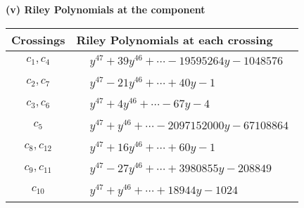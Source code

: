 \documentclass[1p]{elsarticle_modified}
\theoremstyle{definition}
\begin{document}
\flushleft \textbf{(v) Riley Polynomials at the component}\newline \\
\begin{tabular}{m{50pt}|m{274pt}}
Crossings & \hspace{64pt}Riley Polynomials at each crossing \\
\hline $$\begin{aligned}c_{1},c_{4}\end{aligned}$$&$\begin{aligned}
&y^{47}+39 y^{46}+\cdots-19595264 y-1048576
\end{aligned}$\\
\hline $$\begin{aligned}c_{2},c_{7}\end{aligned}$$&$\begin{aligned}
&y^{47}-21 y^{46}+\cdots+40 y-1
\end{aligned}$\\
\hline $$\begin{aligned}c_{3},c_{6}\end{aligned}$$&$\begin{aligned}
&y^{47}+4 y^{46}+\cdots-67 y-4
\end{aligned}$\\
\hline $$\begin{aligned}c_{5}\end{aligned}$$&$\begin{aligned}
&y^{47}+y^{46}+\cdots-2097152000 y-67108864
\end{aligned}$\\
\hline $$\begin{aligned}c_{8},c_{12}\end{aligned}$$&$\begin{aligned}
&y^{47}+16 y^{46}+\cdots+60 y-1
\end{aligned}$\\
\hline $$\begin{aligned}c_{9},c_{11}\end{aligned}$$&$\begin{aligned}
&y^{47}-27 y^{46}+\cdots+3980855 y-208849
\end{aligned}$\\
\hline $$\begin{aligned}c_{10}\end{aligned}$$&$\begin{aligned}
&y^{47}+y^{46}+\cdots+18944 y-1024
\end{aligned}$\\
\hline
\end{tabular}\\~\\
\end{document}
